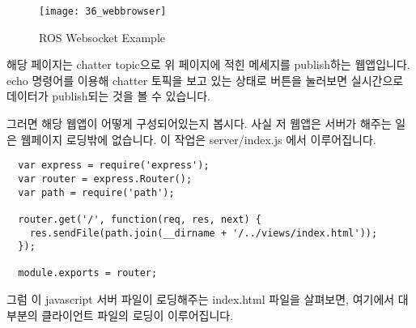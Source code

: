 \documentclass[11pt,fleqn]{book} %
\begin{document}
\begin{figure}[h]
\centering\texttt{[image: 36\_webbrowser]}
\caption{ROS Websocket Example}
\end{figure}

해당 페이지는 chatter topic으로 위 페이지에 적힌 메세지를 publish하는 웹앱입니다.
echo 명령어를 이용해 chatter 토픽을 보고 있는 상태로 버튼을 눌러보면 실시간으로 데이터가 publish되는 것을 볼 수 있습니다.

그러면 해당 웹앱이 어떻게 구성되어있는지 봅시다. 사실 저 웹앱은 서버가 해주는 일은 웹페이지 로딩밖에 없습니다.
이 작업은 server/index.js 에서 이루어집니다.

\begin{verbatim}
  var express = require('express');
  var router = express.Router();
  var path = require('path');

  router.get('/', function(req, res, next) {
    res.sendFile(path.join(__dirname + '/../views/index.html'));
  });

  module.exports = router;
\end{verbatim}

그럼 이 javascript 서버 파일이 로딩해주는 index.html 파일을 살펴보면, 여기에서 대부분의 클라이언트 파일의 로딩이 이루어집니다.
\end{document}
